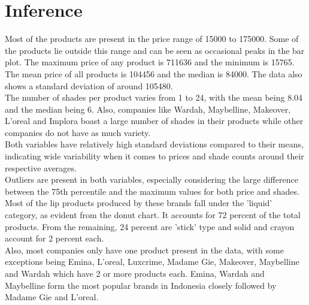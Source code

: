 \documentclass{article}
\begin{document}
\section{Inference}

Most of the products are present in the price range of 15000 to 175000. Some of the products lie outside this range and can be seen as occasional peaks in the bar plot. The maximum price of any product is 711636 and the minimum is 15765. The mean price of all products is 104456 and the median is 84000. The data also shows a standard deviation of around 105480. \\

\noindent The number of shades per product varies from 1 to 24, with the mean being 8.04 and the median being 6. Also, companies like Wardah, Maybelline, Makeover, L'oreal and Implora boast a large number of shades in their products while other companies do not have as much variety. \\

\noindent Both variables have relatively high standard deviations compared to their means, indicating wide variability when it comes to prices and shade counts around their respective averages. \\

\noindent Outliers are present in both variables, especially considering the large difference between the 75th percentile and the maximum values for both price and shades. \\

\noindent Most of the lip products produced by these brands fall under the 'liquid' category, as evident from the donut chart. It accounts for 72 percent of the total products. From the remaining, 24 percent are 'stick' type and solid and crayon account for 2 percent each. \\

\noindent Also, most companies only have one product present in the data, with some exceptions being Emina, L'oreal, Luxcrime, Madame Gie, Makeover, Maybelline and Wardah which have 2 or more products each. Emina, Wardah and Maybelline form the most popular brands in Indonesia closely followed by Madame Gie and L'oreal. \\

\newpage



\newpage

\end{document}
